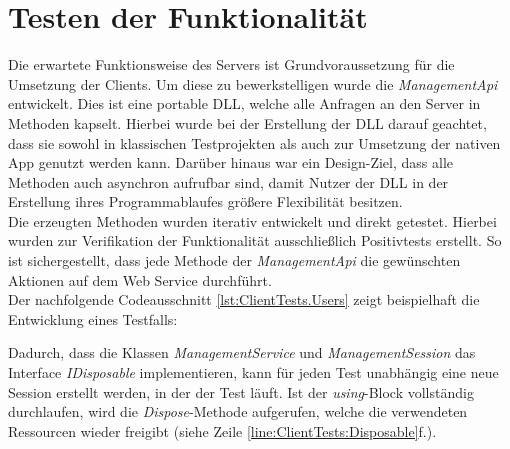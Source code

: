 \section{Testen der Funktionalität}
\label{sec:server-tests}
Die erwartete Funktionsweise des Servers ist Grundvoraussetzung für die Umsetzung der Clients. Um diese zu bewerkstelligen wurde die \textit{ManagementApi} entwickelt. Dies ist eine portable \ac{DLL}, welche alle Anfragen an den Server in Methoden kapselt. Hierbei wurde bei der Erstellung der \ac{DLL} darauf geachtet, dass sie sowohl in klassischen Testprojekten als auch zur Umsetzung der nativen \gls{App} genutzt werden kann. Darüber hinaus war ein Design-Ziel, dass alle Methoden auch asynchron aufrufbar sind, damit Nutzer der \ac{DLL} in der Erstellung ihres Programmablaufes größere Flexibilität besitzen. \\
Die erzeugten Methoden wurden iterativ entwickelt und direkt getestet. Hierbei wurden zur Verifikation der Funktionalität ausschließlich Positivtests erstellt. So ist sichergestellt, dass jede Methode der \textit{ManagementApi} die gewünschten Aktionen auf dem Web Service durchführt. \\
Der nachfolgende Codeausschnitt \ref{lst:ClientTests.Users} zeigt beispielhaft die Entwicklung eines Testfalls:

Dadurch, dass die Klassen \textit{ManagementService} und \textit{ManagementSession} das Interface \textit{IDisposable} implementieren, kann für jeden Test unabhängig eine neue Session erstellt werden, in der der Test läuft. Ist der \textit{using}-Block vollständig durchlaufen, wird die \textit{Dispose}-Methode aufgerufen, welche die verwendeten Ressourcen wieder freigibt (siehe Zeile \ref{line:ClientTests:Disposable}f.). 